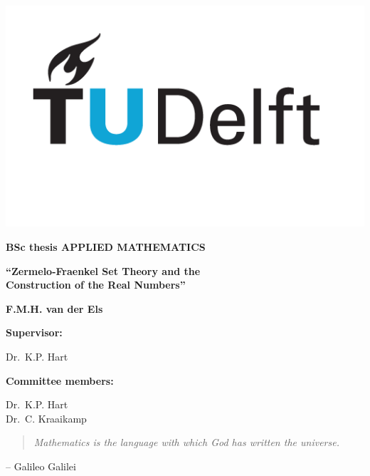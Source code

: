 \documentclass[10pt, a4paper]{report}
\theoremstyle{definition}
\begin{document}
\begin{titlepage}
    \null
\end{titlepage}
\newpage

\begin{titlepage}
    \begin{flushright}
        \includegraphics[width=.5\linewidth]{figures/tudelft}
    \end{flushright}
    \begin{center}
        {\large\bfseries BSc thesis APPLIED MATHEMATICS}

        \vspace*{3em}

        {\large\bfseries ``Zermelo-Fraenkel Set Theory and the \\ Construction of the Real Numbers''}

        \vspace*{3em}

        {\large\bfseries F.M.H. van der Els}
    \end{center}

    \vspace*{15em}

    \begin{flushleft}
        {\large\bfseries Supervisor:}

        \vspace*{1em}

        {\large Dr.\ K.P. Hart}

        \vspace*{3em}

        {\large\bfseries Committee members:}

        \vspace*{1em}

        {\large Dr.\ K.P. Hart \\[1em] Dr.\ C. Kraaikamp}
    \end{flushleft}
\end{titlepage}
\newpage

\begin{titlepage}
    \begin{quote}
        \textit{Mathematics is the language with which God has written the universe.}
    \end{quote}
    \begin{flushright}
         -- Galileo Galilei
    \end{flushright}
\end{titlepage}
\newpage
\end{document}
